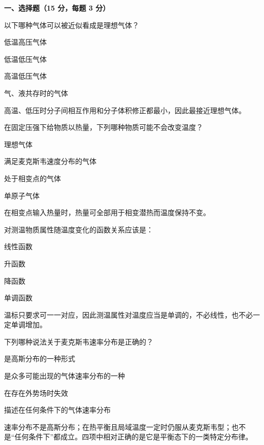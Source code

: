 ﻿


\textbf{一、选择题（15 分，每题 3 分）}
\begin{question}
以下哪种气体可以被近似看成是理想气体？
\begin{choiceoptions}
\item 低温高压气体
\item 低温低压气体
\item 高温低压气体
\item 气、液共存时的气体
\end{choiceoptions}
\begin{solution}
高温、低压时分子间相互作用和分子体积修正都最小，因此最接近理想气体。
\end{solution}
\end{question}

\begin{question}
在固定压强下给物质以热量，下列哪种物质可能不会改变温度？
\begin{choiceoptions}
\item 理想气体
\item 满足麦克斯韦速度分布的气体
\item 处于相变点的气体
\item 单原子气体
\end{choiceoptions}
\begin{solution}
在相变点输入热量时，热量可全部用于相变潜热而温度保持不变。
\end{solution}
\end{question}

\begin{question}
对测温物质属性随温度变化的函数关系应该是：
\begin{choiceoptions}
\item 线性函数
\item 升函数
\item 降函数
\item 单调函数
\end{choiceoptions}
\begin{solution}
温标只要求可一一对应，因此测温属性对温度应当是单调的，不必线性，也不必一定单调增加。
\end{solution}
\end{question}

\begin{question}
下列哪种说法关于麦克斯韦速率分布是正确的？
\begin{choiceoptions}
\item 是高斯分布的一种形式
\item 是众多可能出现的气体速率分布的一种
\item 在存在外势场时失效
\item 描述在任何条件下的气体速率分布
\end{choiceoptions}
\begin{solution}
速率分布不是高斯分布；在热平衡且局域温度一定时仍服从麦克斯韦型；也不是“任何条件下”都成立。四项中相对正确的是它是平衡态下的一类特定分布律。
\end{solution}
\end{question}

